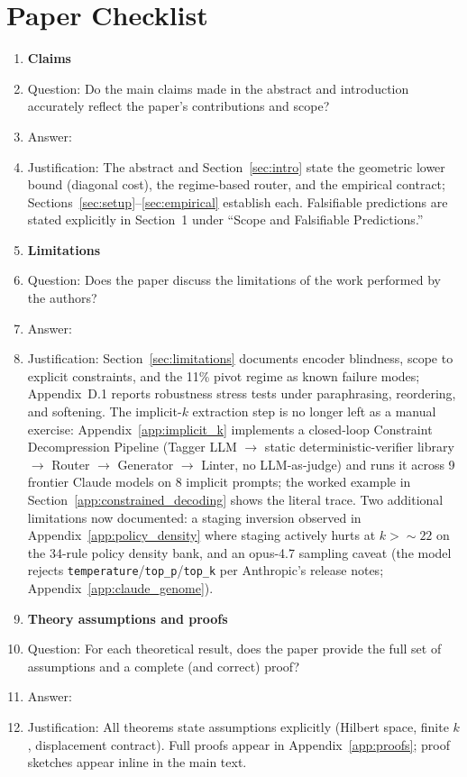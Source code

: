 \section*{Paper Checklist}

\begin{enumerate}

\item {\bf Claims}
    \item[] Question: Do the main claims made in the abstract and introduction accurately reflect the paper's contributions and scope?
    \item[] Answer: \answerYes{}
    \item[] Justification: The abstract and Section~\ref{sec:intro} state the geometric lower bound (diagonal cost), the regime-based router, and the empirical contract; Sections~\ref{sec:setup}--\ref{sec:empirical} establish each. Falsifiable predictions are stated explicitly in Section~1 under ``Scope and Falsifiable Predictions.''

\item {\bf Limitations}
    \item[] Question: Does the paper discuss the limitations of the work performed by the authors?
    \item[] Answer: \answerYes{}
    \item[] Justification: Section~\ref{sec:limitations} documents encoder blindness, scope to explicit constraints, and the 11\% pivot regime as known failure modes; Appendix~D.1 reports robustness stress tests under paraphrasing, reordering, and softening. The implicit-$k$ extraction step is no longer left as a manual exercise: Appendix~\ref{app:implicit_k} implements a closed-loop Constraint Decompression Pipeline (Tagger LLM $\to$ static deterministic-verifier library $\to$ Router $\to$ Generator $\to$ Linter, no LLM-as-judge) and runs it across 9 frontier Claude models on 8 implicit prompts; the worked example in Section~\ref{app:constrained_decoding} shows the literal trace. Two additional limitations now documented: a staging inversion observed in Appendix~\ref{app:policy_density} where staging actively hurts at $k > {\sim}22$ on the 34-rule policy density bank, and an opus-4.7 sampling caveat (the model rejects \texttt{temperature}/\texttt{top\_p}/\texttt{top\_k} per Anthropic's release notes; Appendix~\ref{app:claude_genome}).

\item {\bf Theory assumptions and proofs}
    \item[] Question: For each theoretical result, does the paper provide the full set of assumptions and a complete (and correct) proof?
    \item[] Answer: \answerYes{}
    \item[] Justification: All theorems state assumptions explicitly (Hilbert space, finite $k$, displacement contract). Full proofs appear in Appendix~\ref{app:proofs}; proof sketches appear inline in the main text.


\end{enumerate}
